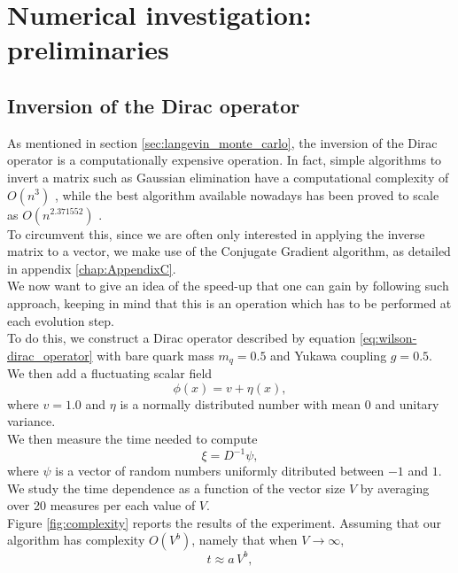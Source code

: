 \chapter{Numerical investigation: preliminaries}
\label{chapt:results_preliminary}

\section{Inversion of the Dirac operator}
\label{sec:inversion_dirac}
As mentioned in section \ref{sec:langevin_monte_carlo}, the inversion of the Dirac operator is a computationally expensive operation. In fact, simple algorithms to invert a matrix such as Gaussian elimination have a computational complexity of $O(n^3)$ \cite{cond_num_ref}, while the best algorithm available nowadays has been proved to scale as $O(n^{2.371552})$ \cite{williams2023new}. \\
To circumvent this, since we are often only interested in applying the inverse matrix to a vector, we make use of the Conjugate Gradient algorithm, as detailed in appendix \ref{chap:AppendixC}. \\
We now want to give an idea of the speed-up that one can gain by following such approach, keeping in mind that this is an operation which has to be performed at each evolution step.  \\
To do this, we construct a Dirac operator described by equation \eqref{eq:wilson-dirac_operator} with bare quark mass $m_q = 0.5$ and Yukawa coupling $g=0.5$. We then add a fluctuating scalar field 
\begin{equation*} 
    \phi(x) = v + \eta(x),
\end{equation*} 
where $v = 1.0$ and $\eta$ is a normally distributed number with mean $0$ and unitary variance. \\
We then measure the time needed to compute 
\begin{equation*}
    \xi = D^{-1}\psi,
\end{equation*}
where $\psi$ is a vector of random numbers uniformly ditributed between $-1$ and $1$. We study the time dependence as a function of the vector size $V$ by averaging over 20 measures per each value of $V$. \\
Figure \ref{fig:complexity} reports the results of the experiment. Assuming that our algorithm has complexity $O(V^b)$, namely that when $V \to \infty$,
\begin{equation*}
    t \approx a \, V^b,
\end{equation*}
